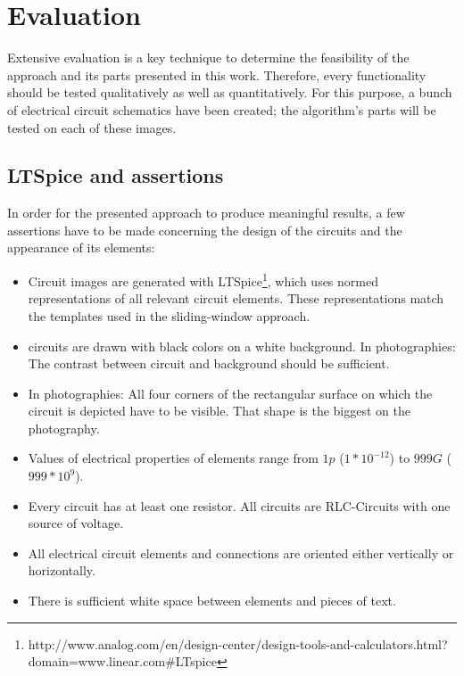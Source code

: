\documentclass[10pt,twocolumn,letterpaper]{article}
\begin{document}

\section{Evaluation}
\label{sec:eval}

Extensive evaluation is a key technique to determine the feasibility of the approach and its parts presented in this work. Therefore, every functionality should be tested qualitatively as well as quantitatively. For this purpose, a bunch of electrical circuit schematics have been created; the algorithm's parts will be tested on each of these images. 
\par

\subsection{LTSpice and assertions}
\label{subsec:spice}

In order for the presented approach to produce meaningful results, a few assertions have to be made concerning the design of the circuits and the appearance of its elements:

\begin{itemize}
	\item Circuit images are generated with LTSpice\footnote[1]{http://www.analog.com/en/design-center/design-tools-and-calculators.html?domain=www.linear.com\#LTspice}, which uses normed representations of all relevant circuit elements. These representations match the templates used in the sliding-window approach.
	\item circuits are drawn with black colors on a white background. In photographies: The contrast between circuit and background should be sufficient.
	\item In photographies: All four corners of the rectangular surface on which the circuit is depicted have to be visible. That shape is the biggest on the photography.
	\item Values of electrical properties of elements range from $1p$ ($1 * 10^{-12}$) to $999G$ ($999* 10^{9}$).
	\item Every circuit has at least one resistor. All circuits are RLC-Circuits with one source of voltage.
	\item All electrical circuit elements and connections are oriented either vertically or horizontally.
	\item There is sufficient white space between elements and pieces of text.
\end{itemize}
\par
\end{document}
